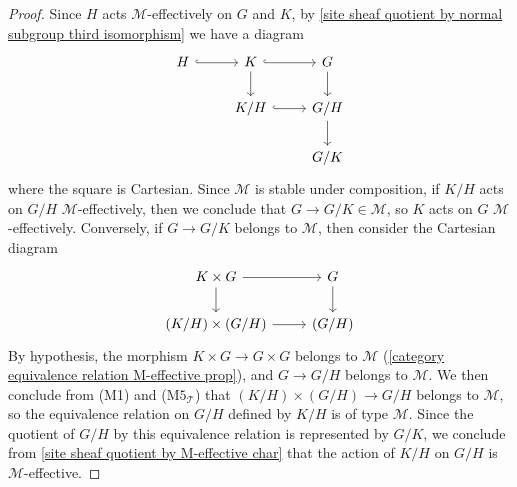 \begin{proof}
Since $H$ acts $\mathcal{M}$-effectively on $G$ and $K$, by \cref{site sheaf quotient by normal subgroup third isomorphism} we have a diagram
\[\begin{tikzcd}
H\ar[r,hook]&K\ar[r,hook]\ar[d]&G\ar[d]\\
&K/H\ar[r,hook]&G/H\ar[d]\\
&&G/K
\end{tikzcd}\]
where the square is Cartesian. Since $\mathcal{M}$ is stable under composition, if $K/H$ acts on $G/H$ $\mathcal{M}$-effectively, then we conclude that $G\to G/K\in\mathcal{M}$, so $K$ acts on $G$ $\mathcal{M}$-effectively. Conversely, if $G\to G/K$ belongs to $\mathcal{M}$, then consider the Cartesian diagram
\[\begin{tikzcd}
K\times G\ar[r]\ar[d]&G\ar[d]\\
(K/H)\times(G/H)\ar[r]&(G/H)
\end{tikzcd}\]
By hypothesis, the morphism $K\times G\to G\times G$ belongs to $\mathcal{M}$ (\cref{category equivalence relation M-effective prop}), and $G\to G/H$ belongs to $\mathcal{M}$. We then conclude from (M1) and ($\text{M5}_\mathcal{T}$) that $(K/H)\times(G/H)\to G/H$ belongs to $\mathcal{M}$, so the equivalence relation on $G/H$ defined by $K/H$ is of type $\mathcal{M}$. Since the quotient of $G/H$ by this equivalence relation is represented by $G/K$, we conclude from \cref{site sheaf quotient by M-effective char} that the action of $K/H$ on $G/H$ is $\mathcal{M}$-effective. 
\end{proof}

